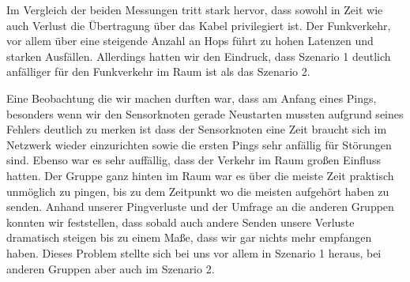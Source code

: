 \documentclass[]{scrartcl}
\begin{document}
Im Vergleich der beiden Messungen tritt stark hervor, dass sowohl in Zeit wie auch Verlust die Übertragung über das Kabel privilegiert ist. Der Funkverkehr, vor allem über eine steigende Anzahl an Hops führt zu hohen Latenzen und starken Ausfällen. Allerdings hatten wir den Eindruck, dass Szenario 1 deutlich anfälliger für den Funkverkehr im Raum ist als das Szenario 2.

Eine Beobachtung die wir machen durften war, dass am Anfang eines Pings, besonders wenn wir den Sensorknoten gerade Neustarten mussten aufgrund seines Fehlers deutlich zu merken ist dass der Sensorknoten eine Zeit braucht sich im Netzwerk wieder einzurichten sowie die ersten Pings sehr anfällig für Störungen sind. Ebenso war es sehr auffällig, dass der Verkehr im Raum großen Einfluss hatten. Der Gruppe ganz hinten im Raum war es über die meiste Zeit praktisch unmöglich zu pingen, bis zu dem Zeitpunkt wo die meisten aufgehört haben zu senden. Anhand unserer Pingverluste und der Umfrage an die anderen Gruppen konnten wir feststellen, dass sobald auch andere Senden unsere Verluste dramatisch steigen bis zu einem Maße, dass wir gar nichts mehr empfangen haben. Dieses Problem stellte sich bei uns vor allem in Szenario 1 heraus, bei anderen Gruppen aber auch im Szenario 2.
\end{document}
